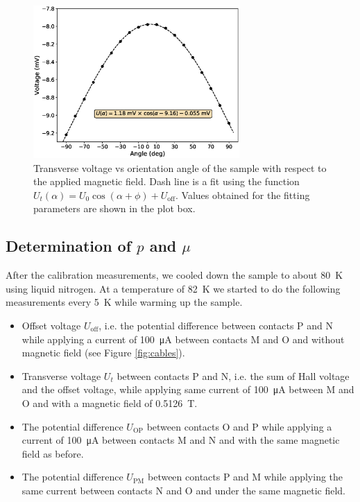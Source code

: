 \documentclass[11pt,a4paper]{article}
\begin{document}
\begin{figure}[H]
\centering
\includegraphics[width=0.7\textwidth]{Voltage_vs_angle.eps}
\caption{Transverse voltage vs orientation angle of the sample with respect to the applied magnetic field. Dash line is a fit using the function $U_t(\alpha)=U_0\cos(\alpha+\phi) + U_\text{off}$. Values obtained for the fitting parameters are shown in the plot box.}
\label{fig:orientation}
\end{figure}

\subsection{Determination of $p$ and $\mu$}

After the calibration measurements, we cooled down the sample to about \SI{80}{\kelvin} using liquid nitrogen. At a temperature of \SI{82}{\kelvin} we started to do the following measurements every \SI{5}{\kelvin} while warming up the sample.
\begin{itemize}
\item Offset voltage $U_\text{off}$, i.e. the potential difference between contacts P and N while applying a current of \SI{100}{\micro\ampere} between contacts M and O and without magnetic field (see Figure \ref{fig:cables}).
\item Transverse voltage $U_t$ between contacts P and N, i.e. the sum of Hall voltage and the offset voltage, while applying same current of \SI{100}{\micro\ampere} between M and O and with a magnetic field of \SI{0.5126}{\tesla}.
\item The potential difference $U_\text{OP}$ between contacts O and P while applying a current of \SI{100}{\micro\ampere} between contacts M and N and with the same magnetic field as before.
\item The potential difference $U_\text{PM}$ between contacts P and M while applying the same current between contacts N and O and under the same magnetic field.
\end{itemize}
\end{document}
